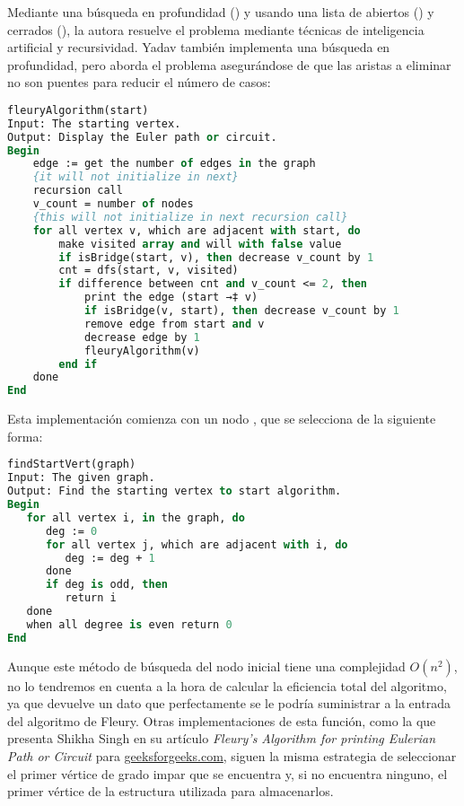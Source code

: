 Mediante una búsqueda en profundidad () y usando una lista de abiertos () y cerrados (), la autora resuelve el problema mediante técnicas de inteligencia artificial y recursividad.
Yadav también implementa una búsqueda en profundidad, pero aborda el problema asegurándose de que las aristas a eliminar no son puentes para reducir el número de casos:

\begin{lstlisting}[language=Pascal]
fleuryAlgorithm(start)
Input: The starting vertex.
Output: Display the Euler path or circuit.
Begin
	edge := get the number of edges in the graph
	{it will not initialize in next}
	recursion call
	v_count = number of nodes
	{this will not initialize in next recursion call}
	for all vertex v, which are adjacent with start, do
		make visited array and will with false value
		if isBridge(start, v), then decrease v_count by 1
		cnt = dfs(start, v, visited)
		if difference between cnt and v_count <= 2, then
			print the edge (start →‡ v)
			if isBridge(v, start), then decrease v_count by 1
			remove edge from start and v
			decrease edge by 1
			fleuryAlgorithm(v)
		end if
	done
End
\end{lstlisting}

Esta implementación comienza con un nodo , que se selecciona de la siguiente forma:

\begin{lstlisting}[language=Pascal]
findStartVert(graph)
Input: The given graph.
Output: Find the starting vertex to start algorithm.
Begin
   for all vertex i, in the graph, do
      deg := 0
      for all vertex j, which are adjacent with i, do
         deg := deg + 1
      done
      if deg is odd, then
         return i
   done
   when all degree is even return 0
End
\end{lstlisting}

Aunque este método de búsqueda del nodo inicial tiene una complejidad $O(n^2)$, no lo tendremos en cuenta a la hora de calcular la eficiencia total del algoritmo, ya que devuelve un dato que perfectamente se le podría suministrar a la entrada del algoritmo de Fleury.
Otras implementaciones de esta función, como la que presenta Shikha Singh en su artículo \textit{Fleury’s Algorithm for printing Eulerian Path or Circuit} para \url{geeksforgeeks.com}, siguen la misma estrategia de seleccionar el primer vértice de grado impar que se encuentra y, si no encuentra ninguno, el primer vértice de la estructura utilizada para almacenarlos.

